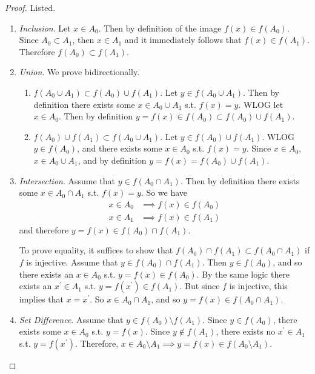 \documentclass{article}
\begin{document}
    \begin{proof}
      Listed. 
      \begin{enumerate}
        \item \textit{Inclusion}. Let $x \in A_0$. Then by definition of the image $f(x) \in f(A_0)$. Since $A_0 \subset A_1$, then $x \in A_1$ and it immediately follows that $f(x) \in f(A_1)$. Therefore $f(A_0) \subset f(A_1)$. 

        \item \textit{Union}. We prove bidirectionally. 
        \begin{enumerate}
          \item $f(A_0 \cup A_1) \subset f(A_0) \cup f(A_1)$. Let $y \in f(A_0 \cup A_1)$. Then by definition there exists some $x \in A_0 \cup A_1$ s.t. $f(x) = y$. WLOG let $x \in A_0$. Then by definition $y = f(x) \in f(A_0) \subset f(A_0) \cup f(A_1)$. 

          \item $f(A_0) \cup f(A_1) \subset f(A_0 \cup A_1)$. Let $y \in f(A_0) \cup f(A_1)$. WLOG $y \in f(A_0)$, and there exists some $x \in A_0$ s.t. $f(x) = y$. Since $x \in A_0$, $x \in A_0 \cup A_1$, and by definition $y = f(x) = f(A_0) \cup f(A_1)$. 
        \end{enumerate}

        \item \textit{Intersection}. Assume that $y \in f(A_0 \cap A_1)$. Then by definition there exists some $x \in A_0 \cap A_1$ s.t. $f(x) = y$. So we have 
        \begin{align}
          x \in A_0 & \implies f(x) \in f(A_0) \\
          x \in A_1 & \implies f(x) \in f(A_1)
        \end{align} 
        and therefore $y = f(x) \in f(A_0) \cap f(A_1)$. 

        To prove equality, it suffices to show that $f(A_0) \cap f(A_1) \subset f(A_0 \cap A_1)$ if $f$ is injective. Assume that $y \in f(A_0) \cap f(A_1)$. Then $y \in f(A_0)$, and so there exists an $x \in A_0$ s.t. $y = f(x) \in f(A_0)$. By the same logic there exists an $x^\prime \in A_1$ s.t. $y = f(x^\prime) \in f(A_1)$. But since $f$ is injective, this implies that $x = x^\prime$. So $x \in A_0 \cap A_1$, and so $y = f(x) \in f(A_0 \cap A_1)$. 

        \item \textit{Set Difference}. Assume that $y \in f(A_0) \setminus f(A_1)$. Since $y \in f(A_0)$, there exists some $x \in A_0$ s.t. $y = f(x)$. Since $y \not\in f(A_1)$, there exists no $x^\prime \in A_1$ s.t. $y = f(x^\prime)$.  Therefore, $x \in A_0 \setminus A_1 \implies y = f(x) \in f(A_0 \setminus A_1)$. 


\end{enumerate}
\end{proof}
\end{document}
